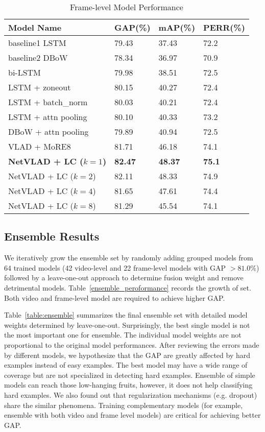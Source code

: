 \documentclass[10pt,twocolumn,letterpaper]{article}
\begin{document}
\begin{table}[]
\centering
\caption{Frame-level Model Performance}
\label{frame_level_peroformance}
\begin{tabular}{lP{1cm}P{1cm}P{1cm}}
Model Name & GAP(\%) & mAP(\%) & PERR(\%) \\ \hline \hline
baseline1 LSTM & 79.43 & 37.43    & 72.2      \\
baseline2 DBoW & 78.34 & 36.97 & 70.9 \\
\hline %
bi-LSTM & 79.98 & 38.51    & 72.5     \\
LSTM + zoneout~\cite{krueger2016zoneout} &  80.15 & 40.27  & 72.4  \\
LSTM + batch\_norm~\cite{cooijmans2016recurrent}  & 80.03  &  40.21 & 72.4 \\
LSTM + attn pooling & 80.10 & 40.33   & 73.2 \\
DBoW + attn pooling & 79.89 & 40.94    &  72.5 \\
VLAD + MoRE8 &  81.71      &    46.18   &   74.1 \\
\hline %
\textbf{NetVLAD + LC ($k=1$)} & \textbf{82.47} & \textbf{48.37} & \textbf{75.1} \\
NetVLAD + LC ($k=2$) & 82.11 & 48.33 & 74.9 \\
NetVLAD + LC ($k=4$) & 81.65 & 47.61 & 74.4 \\
NetVLAD + LC ($k=8$) & 81.29 & 45.54 & 74.1 \\
\hline
\end{tabular}
\end{table}

\subsection{Ensemble Results}
We iteratively grow the ensemble set by randomly adding grouped models from 64 trained models (42 video-level and 22 frame-level models with GAP $> 81.0\%$) followed by a leave-one-out approach to determine fusion weight and remove detrimental models. Table~\ref{ensemble_peroformance} records the growth of set. Both video and frame-level model are required to achieve higher GAP.

Table~\ref{table:ensemble} summarizes the final ensemble set with detailed model weights determined by leave-one-out. Surprisingly, the best single model is not the most important one for ensemble. The individual model weights are not proportional to the original model performances. After reviewing the errors made by different models, we hypothesize that the GAP are greatly affected by hard examples instead of easy examples. The best model may have a wide range of coverage but are not specialized in detecting hard examples. Ensemble of simple models can reach those low-hanging fruits, however, it does not help classifying hard examples. We also found out that regularization mechanisms (e.g. dropout) share the similar phenomena. Training complementary models (for example, ensemble with both video and frame level models) are critical for achieving better GAP. 
\end{document}
